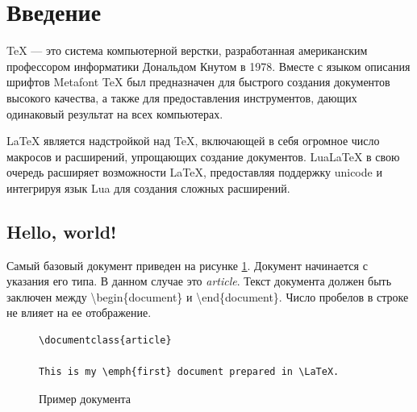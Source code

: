 \setcounter{tocdepth}{3}  %
\hypertarget{contents}{}  %
\tableofcontents
\clearpage

\section{Введение}
TeX --- это система компьютерной верстки, разработанная американским профессором информатики Дональдом Кнутом в 1978.
Вместе с языком описания шрифтов Metafont TeX был предназначен для быстрого создания документов высокого качества, а также для предоставления инструментов, дающих одинаковый результат на всех компьютерах.

LaTeX является надстройкой над TeX, включающей в себя огромное число макросов и расширений, упрощающих создание документов.
LuaLaTeX в свою очередь расширяет возможности LaTeX, предоставляя поддержку unicode и интегрируя язык Lua для создания сложных расширений.

\subsection{Hello, world!}
Самый базовый документ приведен на рисунке \ref{f1}.
Документ начинается с указания его типа.
В данном случае это {\em article}.
Текст документа должен быть заключен между {\textbackslash}begin\{document\} и {\textbackslash}end\{document\}.
Число пробелов в строке не влияет на ее отображение.

\begin{figure}[b]  %
  \centering
\begin{verbatim}
\documentclass{article}

This is my \emph{first} document prepared in \LaTeX.

\end{verbatim}
\caption{Пример документа}
\label{f1}
\end{figure}

